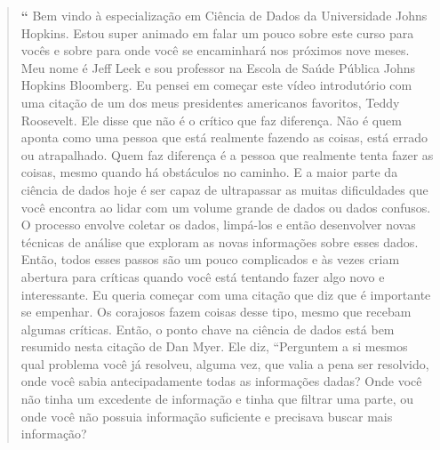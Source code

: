 \begin{quotation}%
\begin{small}
{\large \textbf{``}}%
Bem vindo à especialização em Ciência de Dados da Universidade Johns Hopkins. Estou super animado em falar um pouco sobre este curso para vocês e sobre para onde você se encaminhará nos próximos nove meses. Meu nome é Jeff Leek e sou professor na Escola de Saúde Pública Johns Hopkins Bloomberg. Eu pensei em começar este vídeo introdutório com uma citação de um dos meus presidentes americanos favoritos, Teddy Roosevelt. Ele disse que não é o crítico que faz diferença. Não é quem aponta como uma pessoa que está realmente fazendo as coisas, está errado ou atrapalhado. Quem faz diferença é a pessoa que realmente tenta fazer as coisas, mesmo quando há obstáculos no caminho. E a maior parte da ciência de dados hoje é ser capaz de ultrapassar as muitas dificuldades que você encontra  ao lidar com um volume grande de dados ou dados confusos. O processo envolve coletar os dados, limpá-los e então desenvolver novas técnicas de análise que exploram as novas informações sobre esses dados. Então, todos esses passos são um pouco complicados  e às vezes criam abertura para críticas  quando você está tentando fazer algo novo e interessante. Eu queria começar com uma citação que diz que é importante se empenhar. Os corajosos fazem coisas desse tipo, mesmo que recebam algumas críticas. Então, o ponto chave na ciência de dados está bem resumido nesta citação de Dan Myer. Ele diz, ``Perguntem a si mesmos qual problema você já resolveu, alguma vez, que valia a pena ser resolvido, onde você sabia antecipadamente todas as informações dadas? Onde você não tinha um excedente de informação e tinha que filtrar uma parte, ou onde você não possuia informação suficiente e precisava buscar mais informação?


\end{small}
\end{quotation}
